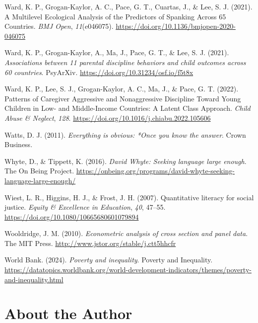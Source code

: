 \documentclass[
  letterpaper,
  DIV=11,
  numbers=noendperiod]{scrreprt}
\newlength{\cslhangindent}
\newenvironment{CSLReferences}[2] %
 {\begin{list}{}{%
  \setlength{\itemindent}{0pt}
  \setlength{\leftmargin}{0pt}
  \setlength{\parsep}{0pt}
  \ifodd #1
   \setlength{\leftmargin}{\cslhangindent}
   \setlength{\itemindent}{-1\cslhangindent}
  \fi
  \setlength{\itemsep}{#2\baselineskip}}}
 {\end{list}}
\begin{document}
\begin{CSLReferences}{1}{0}
Ward, K. P., Grogan-Kaylor, A. C., Pace, G. T., Cuartas, J., \& Lee, S.
J. (2021). {A Multilevel Ecological Analysis of the Predictors of
Spanking Across 65 Countries}. \emph{BMJ Open}, \emph{11}(e046075).
\url{https://doi.org/10.1136/bmjopen-2020-046075}

Ward, K. P., Grogan-Kaylor, A., Ma, J., Pace, G. T., \& Lee, S. J.
(2021). \emph{Associations between 11 parental discipline behaviors and
child outcomes across 60 countries}. PsyArXiv.
\url{https://doi.org/10.31234/osf.io/f5t8x}

Ward, K. P., Lee, S. J., Grogan-Kaylor, A. C., Ma, J., \& Pace, G. T.
(2022). {Patterns of Caregiver Aggressive and Nonaggressive Discipline
Toward Young Children in Low- and Middle-Income Countries: A Latent
Class Approach}. \emph{Child Abuse \& Neglect}, \emph{128}.
\url{https://doi.org/10.1016/j.chiabu.2022.105606}

Watts, D. J. (2011). \emph{Everything is obvious: *Once you know the
answer}. Crown Business.

Whyte, D., \& Tippett, K. (2016). \emph{{D}avid {W}hyte: Seeking
language large enough}. The On Being Project.
\url{https://onbeing.org/programs/david-whyte-seeking-language-large-enough/}

Wiest, L. R., Higgins, H. J., \& Frost, J. H. (2007). Quantitative
literacy for social justice. \emph{Equity \& Excellence in Education},
\emph{40}, 47--55. \url{https://doi.org/10.1080/10665680601079894}

Wooldridge, J. M. (2010). \emph{Econometric analysis of cross section
and panel data}. The MIT Press.
\url{http://www.jstor.org/stable/j.ctt5hhcfr}

World Bank. (2024). \emph{Poverty and inequality}. Poverty and
Inequality.
\url{https://datatopics.worldbank.org/world-development-indicators/themes/poverty-and-inequality.html}

\end{CSLReferences}


\chapter{About the Author}\label{about-the-author}
\end{document}
